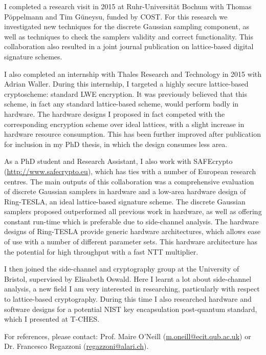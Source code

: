 \documentclass[10pt,a4paper]{moderncv}
\begin{document}
I completed a research visit in 2015 at Ruhr-Universit\"{a}t Bochum with Thomas P\"{o}ppelmann and Tim G\"{u}neysu, funded by COST. For
this research we investigated new techniques for the discrete Gaussian sampling component, as well as techniques to
check the samplers validity and correct functionality. This collaboration also resulted in a joint journal publication on
lattice-based digital signature schemes.\vspace{0.5cm}

I also completed an internship with Thales Research and Technology in 2015 with Adrian Waller. During this
internship, I targeted a highly secure lattice-based cryptoscheme: standard LWE encryption. It was previously believed
that this scheme, in fact any standard lattice-based scheme, would perform badly in hardware. The hardware designs
I proposed in fact competed with the corresponding encryption scheme over ideal lattices, with a slight increase in
hardware resource consumption. This has been further improved after publication for inclusion in my PhD thesis, in
which the design consumes less area.\vspace{0.5cm}

As a PhD student and Research Assistant, I also work with SAFEcrypto (\url{http://www.safecrypto.eu}), which has ties
with a number of European research centres. The main outputs of this collaboration was a comprehensive evaluation
of discrete Gaussian samplers in hardware and a low-area hardware design of Ring-TESLA, an ideal lattice-based
signature scheme. The discrete Gaussian samplers proposed outperformed all previous work in hardware, as well as offering
constant run-time which is preferable due to side-channel analysis. The hardware designs of Ring-TESLA provide
generic hardware architectures, which allows ease of use with a number of different parameter sets. This hardware
architecture has the potential for high throughput with a fast NTT multiplier.\vspace{0.5cm}

I then joined the side-channel and cryptography group at the University of Bristol, supervised by Elisabeth Oswald. Here I learnt a lot about side-channel analysis, a new field I am very interested in researching, particularly with respect to lattice-based cryptography. During this time I also researched hardware and software designs for a potential NIST key encapsulation post-quantum standard, which I presented at T-CHES.\vspace{0.5cm}

For references, please contact: Prof. Maire O'Neill (\url{m.oneill@ecit.qub.ac.uk}) or Dr. Francesco Regazzoni (\url{regazzoni@alari.ch}).
\end{document}
